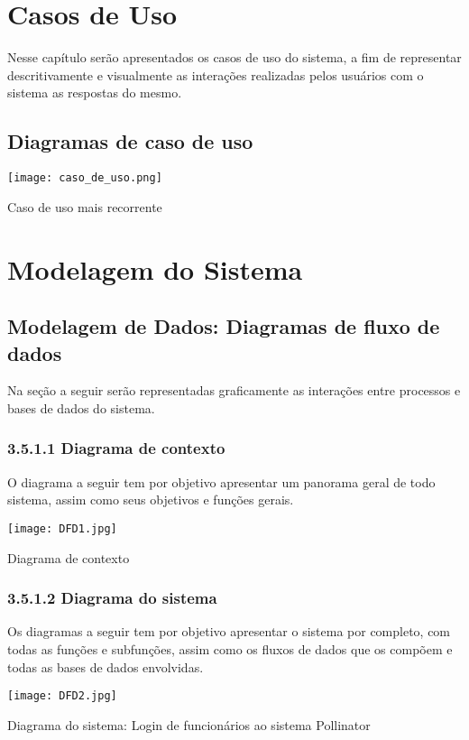 \section{ Casos de Uso}
Nesse capítulo serão apresentados os casos de uso do sistema, a fim de representar descritivamente e visualmente as interações realizadas pelos usuários com o sistema as respostas do mesmo.
\subsection{Diagramas de caso de uso}
\begin{table}[H]
	    \begin{center}
	    \texttt{[image: caso\_de\_uso.png]}
	    \caption{Caso de uso mais recorrente} \label{tab:casoUso}
	    \end{center}
\end{table} 

\section{Modelagem do Sistema}
\subsection{Modelagem de Dados: Diagramas de fluxo de dados}
Na seção a seguir serão representadas graficamente as interações entre processos e bases de dados do sistema. 

	\subsubsection{3.5.1.1 Diagrama de contexto}
	 O diagrama a seguir tem por objetivo apresentar um panorama geral de todo sistema, assim como seus objetivos e funções gerais.
	 \begin{table}[H]
	 \begin{center}
	    \texttt{[image: DFD1.jpg]}
	    \caption{Diagrama de contexto} \label{tab:DFD1}
	 \end{center}
	 \end{table} 
	\subsubsection{3.5.1.2 Diagrama do sistema}
 Os diagramas a seguir tem por objetivo apresentar o sistema por completo, com todas as funções e subfunções, assim como os fluxos de dados que os compõem e todas as bases de dados envolvidas.
 	\begin{table}[H]
	 \begin{center}
	    \texttt{[image: DFD2.jpg]}
	    \caption{Diagrama do sistema: Login de funcionários ao sistema Pollinator } \label{tab:DFD2}
	 \end{center}
	 \end{table} 
	 
